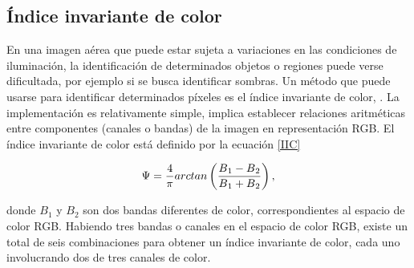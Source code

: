\subsection{Índice invariante de color} \label{seccion iic}
En una imagen aérea que puede estar sujeta a variaciones en las condiciones de iluminación, la identificación de determinados objetos o regiones puede verse dificultada, por ejemplo si se busca identificar sombras. Un método que puede usarse para identificar determinados píxeles es el índice invariante de color, \cite{gevers_pictoseek_2000, tsai_comparative_2006, singhal_automatic_2014, noauthor_using_nodate, sirmacek_building_2008, chang_unsupervised_nodate}. La implementación es relativamente simple, implica establecer relaciones aritméticas entre componentes (canales o bandas) de la imagen en representación RGB. El índice invariante de color está definido por la ecuación \ref{IIC} 


\begin{equation}
	\Psi=\frac{4}{\pi} arctan\left(\frac{B\textsubscript{1}-B\textsubscript{2}}{B\textsubscript{1}+B\textsubscript{2}}\right),\label{IIC}
\end{equation}

 donde $B_1$ y $B_2$ son dos bandas diferentes de color, correspondientes al espacio de color RGB.
Habiendo tres bandas o canales en el espacio de color RGB, existe un total de seis combinaciones para obtener un índice invariante de color, cada uno involucrando dos de tres canales de color.